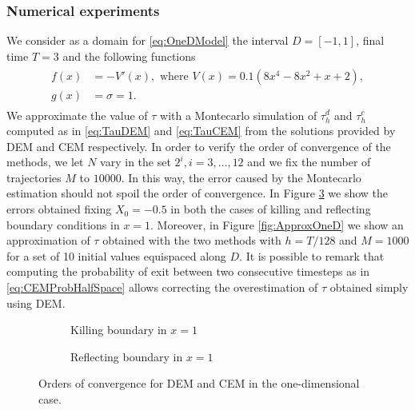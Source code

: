 \subsubsection{Numerical experiments}
We consider as a domain for \eqref{eq:OneDModel} the interval $D = \left[-1,1\right]$, final time $T = 3$ and the following functions
\begin{align}\label{eq:FunctionsOneD}
\begin{split}
	f(x) &= -V'(x), \text{ where } V(x) = 0.1(8x^4 - 8x^2 + x + 2), \\
	g(x) &= \sigma = 1.
\end{split}
\end{align}
We approximate the value of $\tau$ with a Montecarlo simulation of $\tau_h^d$ and $\tau_h^c$ computed as in \eqref{eq:TauDEM} and \eqref{eq:TauCEM} from the solutions provided by DEM and CEM respectively. In order to verify the order of convergence of the methods, we let $N$ vary in the set $2^i,i=3,\dots,12$ and we fix the number of trajectories $M$ to $10000$. In this way, the error caused by the Montecarlo estimation should not spoil the order of convergence. In Figure \ref{fig:OrdersOneD} we show the errors obtained fixing $X_0 = -0.5$ in both the cases of killing and reflecting boundary conditions in $x = 1$. Moreover, in Figure \ref{fig:ApproxOneD} we show an approximation of $\tau$ obtained with the two methods with $h = T/128$ and $M = 1000$ for a set of 10 initial values equispaced along $D$. It is possible to remark that computing the probability of exit between two consecutive timesteps as in \eqref{eq:CEMProbHalfSpace} allows correcting the overestimation of $\tau$ obtained simply using DEM.
\begin{figure}[t]
    \centering
    \begin{subfigure}{0.49\linewidth}
        \centering
        \resizebox{1\linewidth}{!}{ }  
        \caption{Killing boundary in $x = 1$}
        \label{fig:KillOneD}
    \end{subfigure}
    \begin{subfigure}{0.49\linewidth}
        \centering
        \resizebox{1\linewidth}{!}{ }  
        \caption{Reflecting boundary in $x = 1$}
        \label{fig:ReflectOneD}
    \end{subfigure}    
    \caption{Orders of convergence for DEM and CEM in the one-dimensional case.}
    \label{fig:OrdersOneD}
\end{figure}

